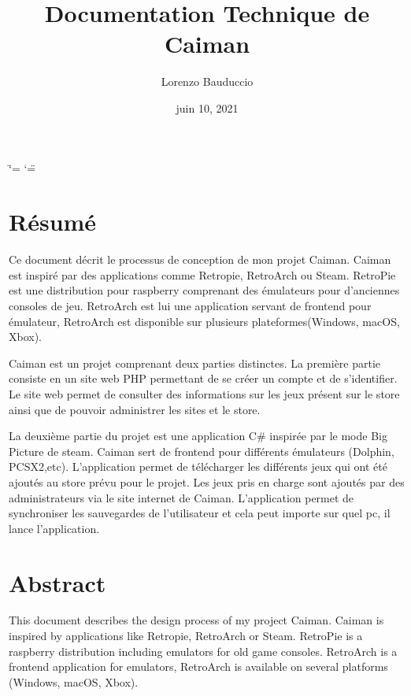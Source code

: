 \documentclass[a4paper,12pt,french]{sphinxmanual}
\title{Documentation Technique de Caiman}
\date{juin 10, 2021}
\author{Lorenzo Bauduccio}
\begin{document}
\ifdefined\shorthandoff
  \ifnum\catcode`\=\string=\active\shorthandoff{=}\fi
  \ifnum\catcode`\"=\active{}\fi
\fi

\pagestyle{empty}
\sphinxmaketitle
\pagestyle{plain}
\sphinxtableofcontents
\pagestyle{normal}
\label{\detokenize{index::doc}}



\chapter{Résumé}
\label{\detokenize{resume:resume}}\label{\detokenize{resume::doc}}
\sphinxAtStartPar
Ce document décrit le processus de conception de mon projet Caiman. Caiman est inspiré par des applications comme Retropie, RetroArch ou Steam. RetroPie est une distribution pour raspberry comprenant des émulateurs pour d’anciennes consoles de jeu. RetroArch est lui une application servant de frontend pour émulateur, RetroArch est disponible sur plusieurs plateformes(Windows, macOS, Xbox).

\sphinxAtStartPar
Caiman est un projet comprenant deux parties distinctes. La première partie consiste en un site web PHP permettant de se créer un compte et de s’identifier. Le site web permet de consulter des informations sur les jeux présent sur le store ainsi que de pouvoir administrer les sites et le store.

\sphinxAtStartPar
La deuxième partie du projet est une application C\# inspirée par le mode Big Picture de steam. Caiman sert de frontend pour différents émulateurs (Dolphin, PCSX2,etc). L’application permet de télécharger les différents jeux qui ont été ajoutés au store prévu pour le projet. Les jeux pris en charge sont ajoutés par des administrateurs via le site internet de Caiman. L’application permet de synchroniser les sauvegardes de l’utilisateur et cela peut importe sur quel pc, il lance l’application.

\sphinxAtStartPar
{}


\chapter{Abstract}
\label{\detokenize{resume:abstract}}
\sphinxAtStartPar
This document describes the design process of my project Caiman. Caiman is inspired by applications like Retropie, RetroArch or Steam. RetroPie is a raspberry distribution including emulators for old game consoles. RetroArch is a frontend application for emulators, RetroArch is available on several platforms (Windows, macOS, Xbox).
\end{document}
